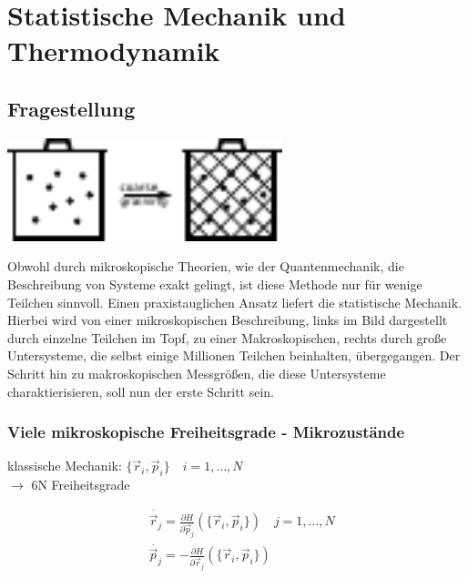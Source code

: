 \chapter{Statistische Mechanik und Thermodynamik}

    \section{Fragestellung}

\begin{center}
    \includegraphics[width=0.6\textwidth]{Abb/1_1.pdf}
\end{center}
Obwohl durch mikroskopische Theorien, wie der Quantenmechanik, die Beschreibung
von Systeme exakt gelingt, ist diese Methode nur für wenige Teilchen sinnvoll.
Einen praxistauglichen Ansatz liefert die statistische Mechanik. Hierbei wird
von einer mikroskopischen Beschreibung, links im Bild dargestellt durch einzelne
Teilchen im Topf, zu einer Makroskopischen, rechts durch große Untersysteme, die
selbst einige Millionen Teilchen beinhalten, übergegangen. Der Schritt hin zu
makroskopischen Messgrößen, die diese Untersysteme charaktierisieren, soll nun
der erste Schritt sein.

    \subsection{Viele mikroskopische Freiheitsgrade - Mikrozustände}

klassische Mechanik: $\{\vec{r}_i, \vec{p}_i\} \quad i = 1, \dots , N$\\
$\rightarrow$ 6N Freiheitsgrade

\begin{align*}
    &\dot{\vec{r}_j} = \frac{\partial H}{\partial \vec{p}_j} \left( \{
                      \vec{r}_i, \vec{p}_i \} \right) \quad j = 1, \dots, N\\
    &\dot{\vec{p}_j} = - \frac{\partial H}{\partial \vec{r}_j} \left( \{
                         \vec{r}_i, \vec{p}_i\}\right)
\end{align*}
